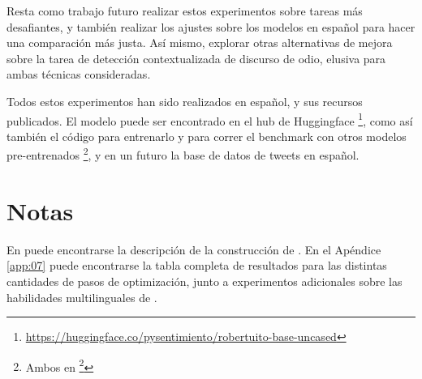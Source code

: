 Resta como trabajo futuro realizar estos experimentos sobre tareas más desafiantes, y también realizar los ajustes sobre los modelos \roberta{} en español para hacer una comparación más justa. Así mismo, explorar otras alternativas de mejora sobre la tarea de detección contextualizada de discurso de odio, elusiva para ambas técnicas consideradas.

Todos estos experimentos han sido realizados en español, y sus recursos publicados. El modelo puede ser encontrado en el hub de Huggingface \footnote{\url{https://huggingface.co/pysentimiento/robertuito-base-uncased}}, como así también el código para entrenarlo y para correr el benchmark con otros modelos pre-entrenados \footnote{Ambos en  \footnote{\url{https://github.com/pysentimiento/robertuito}}}, y en un futuro la base de datos de tweets en español.

\section{Notas}

En \citet{perez2021robertuito} puede encontrarse la descripción de la construcción de \robertuito{}. En el Apéndice \ref{app:07} puede encontrarse la tabla completa de resultados para las distintas cantidades de pasos de optimización, junto a experimentos adicionales sobre las habilidades multilinguales de \robertuito{}.

